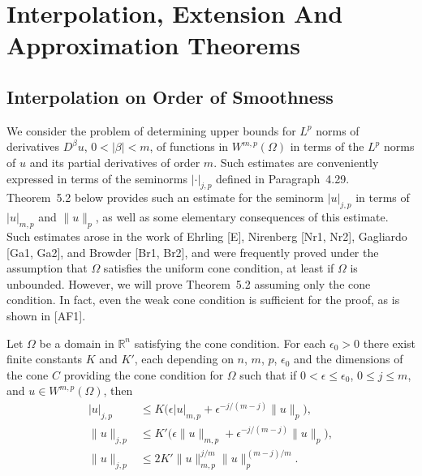 \chapter{Interpolation, Extension And Approximation Theorems}

\section{Interpolation on Order of Smoothness}

\begin{para}
  We consider the problem of determining upper bounds for $L^p$ norms of
  derivatives $D^\beta u$, $0<|\beta|<m$, of functions in $W^{m,p}(\Omega)$
  in terms of the $L^p$ norms of $u$ and its partial derivatives of order $m$.
  Such estimates are conveniently expressed in terms of the seminorms $|\cdot|_{j,p}$
  defined in Paragraph~4.29. Theorem~5.2 below provides such an estimate for
  the seminorm $|u|_{j,p}$ in terms of $|u|_{m,p}$ and $\|u\|_p$, as well as
  some elementary consequences of this estimate. Such estimates arose
  in the work of Ehrling [E], Nirenberg [Nr1, Nr2], Gagliardo [Ga1, Ga2],
  and Browder [Br1, Br2], and were frequently proved under the assumption
  that $\Omega$ satisfies the uniform cone condition, at least if $\Omega$
  is unbounded. However, we will prove Theorem~5.2 assuming only the cone
  condition. In fact, even the weak cone condition is sufficient for the proof,
  as is shown in [AF1].
\end{para}


\begin{theorem}
  Let $\Omega$ be a domain in $\mathbb{R}^n$ satisfying the cone condition.
  For each $\epsilon_0>0$ there exist finite constants $K$ and $K'$, each
  depending on $n$, $m$, $p$, $\epsilon_0$ and the dimensions of the cone $C$
  providing the cone condition for $\Omega$ such that if $0<\epsilon\leq\epsilon_0$,
  $0\leq j\leq m$, and $u\in W^{m,p}(\Omega)$, then
  \begin{align}
    |u|_{j,p} & \leq K\bigl(\epsilon |u|_{m,p} + \epsilon^{-j/(m-j)}\|u\|_p\bigr), \label{eq:5.1} \\
    \|u\|_{j,p} & \leq K'\bigl(\epsilon\|u\|_{m,p} + \epsilon^{-j/(m-j)}\|u\|_p\bigr), \label{eq:5.2} \\
    \|u\|_{j,p} & \leq 2K' \|u\|_{m,p}^{j/m} \|u\|_p^{(m-j)/m}. \label{eq:5.3}
  \end{align}
\end{theorem}


